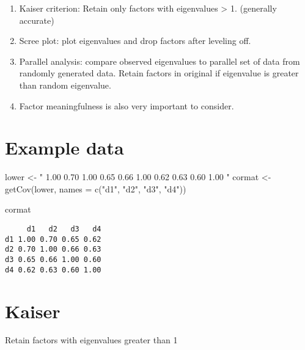 \documentclass[
]{book}
\newenvironment{Shaded}{\begin{snugshade}}{\end{snugshade}}
\newcommand{\AttributeTok}[1]{\textcolor[rgb]{0.77,0.63,0.00}{#1}}
\newcommand{\FunctionTok}[1]{\textcolor[rgb]{0.00,0.00,0.00}{#1}}
\newcommand{\NormalTok}[1]{#1}
\newcommand{\OtherTok}[1]{\textcolor[rgb]{0.56,0.35,0.01}{#1}}
\newcommand{\SpecialCharTok}[1]{\textcolor[rgb]{0.00,0.00,0.00}{#1}}
\newcommand{\StringTok}[1]{\textcolor[rgb]{0.31,0.60,0.02}{#1}}
\providecommand{\tightlist}{%
  \setlength{\itemsep}{0pt}\setlength{\parskip}{0pt}}
\begin{document}
\begin{enumerate}
\def\labelenumi{\arabic{enumi}.}
\tightlist
\item
  Kaiser criterion: Retain only factors with eigenvalues \textgreater{} 1. (generally accurate)
\item
  Scree plot: plot eigenvalues and drop factors after leveling off.
\item
  Parallel analysis: compare observed eigenvalues to parallel set of data from randomly generated data. Retain factors in original if eigenvalue is greater than random eigenvalue.
\item
  Factor meaningfulness is also very important to consider.
\end{enumerate}

\hypertarget{example-data}{%
\section{Example data}\label{example-data}}

\begin{Shaded}
\begin{Highlighting}[]
\NormalTok{lower }\OtherTok{\textless{}{-}} \StringTok{"}
\StringTok{1.00}
\StringTok{0.70 1.00}
\StringTok{0.65 0.66 1.00}
\StringTok{0.62 0.63 0.60 1.00}
\StringTok{"}
\NormalTok{cormat }\OtherTok{\textless{}{-}} \FunctionTok{getCov}\NormalTok{(lower, }\AttributeTok{names =} \FunctionTok{c}\NormalTok{(}\StringTok{"d1"}\NormalTok{, }\StringTok{"d2"}\NormalTok{, }\StringTok{"d3"}\NormalTok{, }\StringTok{"d4"}\NormalTok{))}

\NormalTok{cormat}
\end{Highlighting}
\end{Shaded}

\begin{verbatim}
     d1   d2   d3   d4
d1 1.00 0.70 0.65 0.62
d2 0.70 1.00 0.66 0.63
d3 0.65 0.66 1.00 0.60
d4 0.62 0.63 0.60 1.00
\end{verbatim}

\hypertarget{kaiser}{%
\section{Kaiser}\label{kaiser}}

Retain factors with eigenvalues greater than 1

\begin{Shaded}
\end{Shaded}
\end{document}
